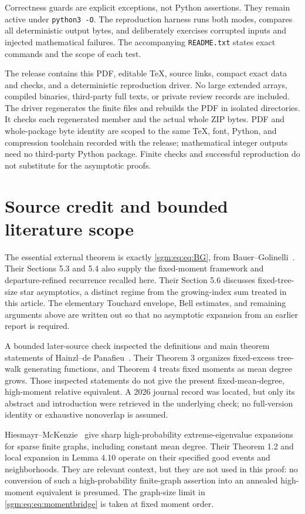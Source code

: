 \documentclass[11pt,letterpaper]{article}
\theoremstyle{remark}\newtheorem{remark}[theorem]{Remark}
\theoremstyle{definition}\newtheorem{definition}[theorem]{Definition}
\begin{document}
Correctness guards are explicit exceptions, not Python assertions. They remain active under \texttt{python3 -O}. The reproduction harness runs both modes, compares all deterministic output bytes, and deliberately exercises corrupted inputs and injected mathematical failures. The accompanying \texttt{README.txt} states exact commands and the scope of each test.

The release contains this PDF, editable \TeX, source links, compact exact data and checks, and a deterministic reproduction driver. No large extended arrays, compiled binaries, third-party full texts, or private review records are included. The driver regenerates the finite files and rebuilds the PDF in isolated directories. It checks each regenerated member and the actual whole ZIP bytes. PDF and whole-package byte identity are scoped to the same \TeX, font, Python, and compression toolchain recorded with the release; mathematical integer outputs need no third-party Python package. Finite checks and successful reproduction do not substitute for the asymptotic proofs.

\section{Source credit and bounded literature scope}\label{sgm:eq:sec:sources}
The essential external theorem is exactly \eqref{sgm:eq:eq:BG}, from Bauer--Golinelli~\cite[Section 5.5, equation (9)]{bg}. Their Sections 5.3 and 5.4 also supply the fixed-moment framework and departure-refined recurrence recalled here. Their Section 5.6 discusses fixed-tree-size star asymptotics, a distinct regime from the growing-index sum treated in this article. The elementary Touchard envelope, Bell estimates, and remaining arguments above are written out so that no asymptotic expansion from an earlier report is required.

A bounded later-source check inspected the definitions and main theorem statements of Hainzl--de Panafieu~\cite{hdp}. Their Theorem 3 organizes fixed-excess tree-walk generating functions, and Theorem 4 treats fixed moments as mean degree grows. Those inspected statements do not give the present fixed-mean-degree, high-moment relative equivalent. A 2026 journal record was located, but only its abstract and introduction were retrieved in the underlying check; no full-version identity or exhaustive nonoverlap is assumed.

Hiesmayr--McKenzie~\cite{hm} give sharp high-probability extreme-eigenvalue expansions for sparse finite graphs, including constant mean degree. Their Theorem 1.2 and local expansion in Lemma 4.10 operate on their specified good events and neighborhoods. They are relevant context, but they are not used in this proof: no conversion of such a high-probability finite-graph assertion into an annealed high-moment equivalent is presumed. The graph-size limit in \eqref{sgm:eq:eq:momentbridge} is taken at fixed moment order.
\end{document}
